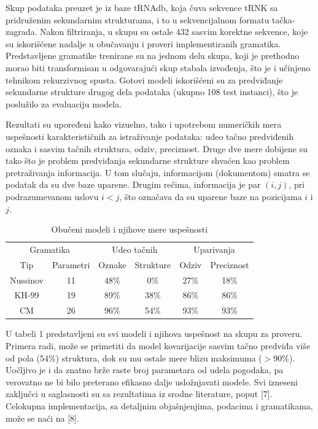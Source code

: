 \documentclass[a4paper, 12pt]{article}
\begin{document}
Skup podataka preuzet je iz baze tRNAdb, koja čuva sekvence tRNK sa pridruženim sekundarnim strukturama, i to u sekvencijalnom formatu tačka-zagrada. Nakon filtriranja, u skupu su ostale 432 sasvim korektne sekvence, koje su iskorišćene nadalje u obučavanju i proveri implementiranih gramatika. Predstavljene gramatike trenirane su na jednom delu skupa, koji je prethodno morao biti transformisan u odgovarajući skup stabala izvođenja, što je i učinjeno tehnikom rekurzivnog spusta. Gotovi modeli iskorišćeni su za predviđanje sekundarne strukture drugog dela podataka (ukupno 108 test instanci), što je poslužilo za evaluaciju modela.

Rezultati su upoređeni kako vizuelno, tako i upotrebom numeričkih mera uspešnosti karakterističnih za istraživanje podataka: udeo tačno predviđenih oznaka i sasvim tačnih struktura, odziv, preciznost. Druge dve mere dobijene su tako što je problem predviđanja sekundarne strukture shvaćen kao problem pretraživanja informacija. U tom slučaju, informacijom (dokumentom) smatra se podatak da su dve baze uparene. Drugim rečima, informacija je par $(i, j)$, pri podrazumevanom uslovu $i < j$, što označava da su uparene baze na pozicijama $i$ i $j$.

\begin{table}[h!]
    \centering
    \caption{Obučeni modeli i njihove mere uspešnosti}
    \begin{tabular}{c c | c c | c c}
        \multicolumn{2}{c}{Gramatika} & \multicolumn{2}{|c|}{Udeo tačnih} & \multicolumn{2}{c}{Uparivanja} \\
        Tip & Parametri & Oznake & Strukture & Odziv & Preciznost \\ \hline
        Nussinov & 11 & 48\% & 0\% & 27\% & 18\% \\
        KH-99 & 19 & 89\% & 38\% & 86\% & 86\% \\
        CM & 26 & 96\% & 54\% & 93\% & 93\%
  \end{tabular}
\end{table}

U tabeli 1 predstavljeni su svi modeli i njihova uspešnost na skupu za proveru. Primera radi, može se primetiti da model kovarijacije sasvim tačno predviđa više od pola (54\%) struktura, dok su mu ostale mere blizu maksimuma ($>$90\%). Uočljivo je i da znatno brže raste broj parametara od udela pogodaka, pa verovatno ne bi bilo preterano efikasno dalje usložnjavati modele. Svi izneseni zaključci u saglasnosti su sa rezultatima iz srodne literature, poput [7]. Celokupna implementacija, sa detaljnim objašnjenjima, podacima i gramatikama, može se naći na [8].
\end{document}
